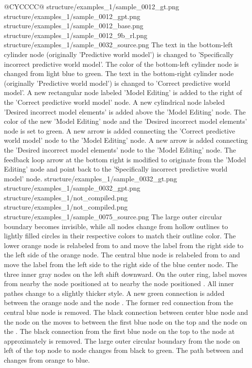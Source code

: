 \begin{table}[t]
\begin{tabularx}{\textwidth}{@{}CYCCCC@{}}
      {structure/examples_1/sample_0012_gt.png}
      {structure/examples_1/sample_0012_gpt.png}
      {structure/examples_1/sample_0012_base.png}
      {structure/examples_1/sample_0012_9b_rl.png}
    \midrule
    \exrowonefour
      {structure/examples_1/sample_0032_source.png}
      {The text in the bottom-left cylinder node (originally 'Predictive world model') is changed to 'Specifically incorrect predictive world model'. The color of the bottom-left cylinder node is changed from light blue to green. The text in the bottom-right cylinder node (originally 'Predictive world model') is changed to 'Correct predictive world model'. A new rectangular node labeled 'Model Editing' is added to the right of the 'Correct predictive world model' node. A new cylindrical node labeled 'Desired incorrect model elements' is added above the 'Model Editing' node. The color of the new 'Model Editing' node and the 'Desired incorrect model elements' node is set to green. A new arrow is added connecting the 'Correct predictive world model' node to the 'Model Editing' node. A new arrow is added connecting the 'Desired incorrect model elements' node to the 'Model Editing' node. The feedback loop arrow at the bottom right is modified to originate from the 'Model Editing' node and point back to the 'Specifically incorrect predictive world model' node.}
      {structure/examples_1/sample_0032_gt.png}
      {structure/examples_1/sample_0032_gpt.png}
      {structure/examples_1/not_compiled.png}
      {structure/examples_1/not_compiled.png}
    \midrule
    \exrowonefive
      {structure/examples_1/sample_0075_source.png}
      {The large outer circular boundary becomes invisible, while all nodes change from hollow outlines to lightly filled circles in their respective colors to match their outline color. The lower orange node is relabeled from  to  and move the label from the right side to the left side of the orange node. The central blue node is relabeled from  to  and move the label from the left side to the right side of the blue center node. The three inner gray nodes on the left shift downward. On the outer ring, label  moves from nearby the node positioned at  to  nearby the node positioned . All inner pathes change to a slightly thicker style. A new green connection is added between the orange node and the node . The former red connection from the central blue node is removed. The black connection between center blue node  and the node on the  moves to between the first blue node on the top and the node on the . The black connection from the first blue node on the top to the node at approximately  is removed. The large outer circular boundary from the node on left of the top node to node  changes from black to green. The path between  and  changes from orange to blue.}

\end{tabularx}
\end{table}

